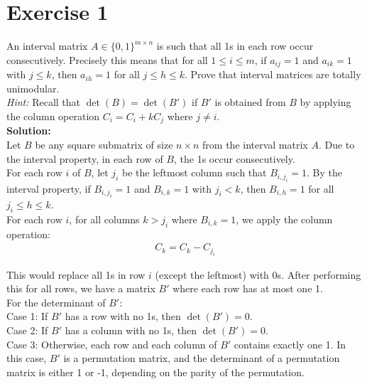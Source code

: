 \documentclass{article}
\begin{document}
\section*{Exercise 1}
An interval matrix $A \in \{0, 1\}^{m\times n}$ is such that all 1s in each row occur consecutively. Precisely this means that for all $1 \leq i \leq m$, if $a_{ij} = 1$ and $a_{ik} = 1$ with $j \leq k$, then $a_{ih} = 1$ for all $j \leq h \leq k$. Prove that interval matrices are totally unimodular. \\

\textit{Hint:} Recall that $\det(B) = \det(B')$ if $B'$ is obtained from $B$ by applying the column operation $C_i = C_i + kC_j$ where $j \neq i$. \\

\textbf{Solution:} \\

Let $B$ be any square submatrix of size $n \times n$ from the interval matrix $A$. Due to the interval property, in each row of $B$, the 1s occur consecutively. \\

For each row $i$ of $B$, let $j_i$ be the leftmost column such that $B_{i,j_i} = 1$. By the interval property, if $B_{i,j_i} = 1$ and $B_{i,k} = 1$ with $j_i < k$, then $B_{i,h} = 1$ for all $j_i \leq h \leq k$. \\

For each row $i$, for all columns $k > j_i$ where $B_{i,k} = 1$, we apply the column operation:
\begin{align*}
C_k = C_k - C_{j_i}
\end{align*}

This would replace all 1s in row $i$ (except the leftmost) with 0s. After performing this for all rows, we have a matrix $B'$ where each row has at most one 1. \\

For the determinant of $B'$: \\

Case 1: If $B'$ has a row with no 1s, then $\det(B') = 0$. \\

Case 2: If $B'$ has a column with no 1s, then $\det(B') = 0$. \\

Case 3: Otherwise, each row and each column of $B'$ contains exactly one 1. In this case, $B'$ is a permutation matrix, and the determinant of a permutation matrix is either 1 or -1, depending on the parity of the permutation. \\
\end{document}
